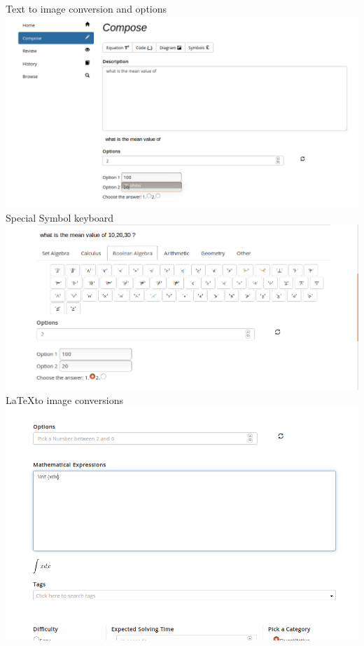 \documentclass[a4paper,12pt,oneside]{book}
\begin{document}
\vspace{1in}
Text to image conversion and options\\
\includegraphics[scale=0.3]{compose.png}	\\

\vspace{2in}
Special Symbol keyboard\\
\includegraphics[scale=0.4]{compose4.png}	\\

\vspace{0.7in}
\LaTeX to image conversions\\
\includegraphics[scale=0.4]{compose5.png}	\\
\end{document}
